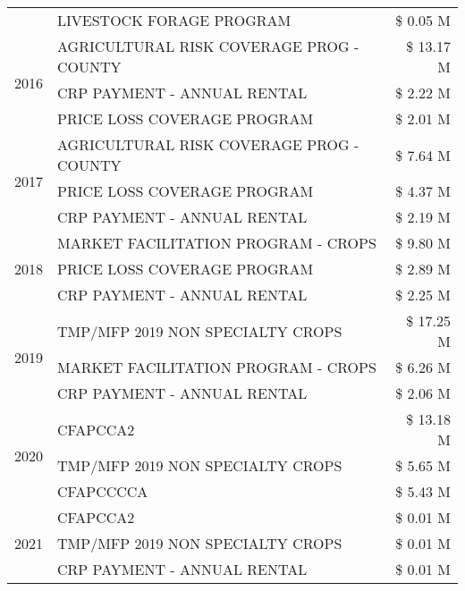 \begin{tabular}{llr}
 & LIVESTOCK FORAGE PROGRAM & \$ 0.05 M \\
\cline{1-3}
\multirow[t]{3}{*}{2016} & AGRICULTURAL RISK COVERAGE PROG - COUNTY & \$ 13.17 M \\
 & CRP PAYMENT - ANNUAL RENTAL & \$ 2.22 M \\
 & PRICE LOSS COVERAGE PROGRAM & \$ 2.01 M \\
\cline{1-3}
\multirow[t]{3}{*}{2017} & AGRICULTURAL RISK COVERAGE PROG - COUNTY & \$ 7.64 M \\
 & PRICE LOSS COVERAGE PROGRAM & \$ 4.37 M \\
 & CRP PAYMENT - ANNUAL RENTAL & \$ 2.19 M \\
\cline{1-3}
\multirow[t]{3}{*}{2018} & MARKET FACILITATION PROGRAM - CROPS & \$ 9.80 M \\
 & PRICE LOSS COVERAGE PROGRAM & \$ 2.89 M \\
 & CRP PAYMENT - ANNUAL RENTAL & \$ 2.25 M \\
\cline{1-3}
\multirow[t]{3}{*}{2019} & TMP/MFP 2019 NON SPECIALTY CROPS & \$ 17.25 M \\
 & MARKET FACILITATION PROGRAM - CROPS & \$ 6.26 M \\
 & CRP PAYMENT - ANNUAL RENTAL & \$ 2.06 M \\
\cline{1-3}
\multirow[t]{3}{*}{2020} & CFAPCCA2 & \$ 13.18 M \\
 & TMP/MFP 2019 NON SPECIALTY CROPS & \$ 5.65 M \\
 & CFAPCCCCA & \$ 5.43 M \\
\cline{1-3}
\multirow[t]{3}{*}{2021} & CFAPCCA2 & \$ 0.01 M \\
 & TMP/MFP 2019 NON SPECIALTY CROPS & \$ 0.01 M \\
 & CRP PAYMENT - ANNUAL RENTAL & \$ 0.01 M \\
\cline{1-3}
\bottomrule
\end{tabular}
